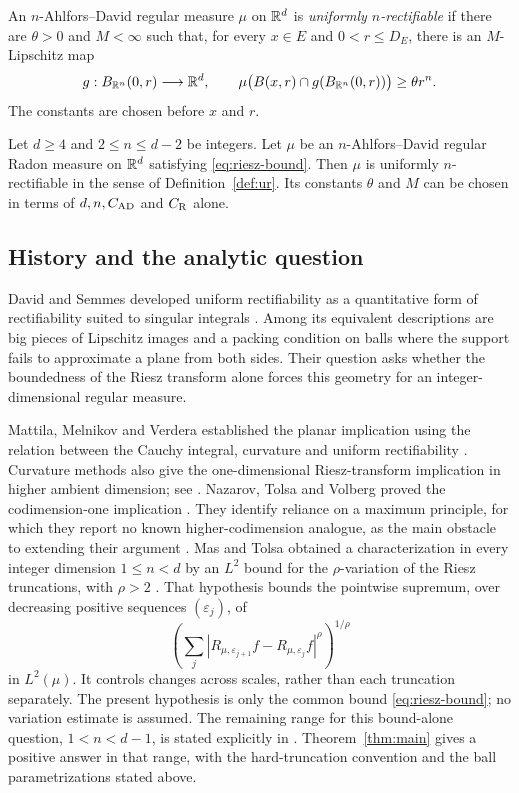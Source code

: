 \begin{definition}\label{def:ur}
An $n$-Ahlfors--David regular measure $\mu$ on $\mathbb R^d$ is
\emph{uniformly $n$-rectifiable} if there are $\theta>0$ and $M<\infty$
such that, for every $x\in E$ and $0<r\le D_E$, there is an
$M$-Lipschitz map
\[
 g:B_{\mathbb R^n}(0,r)\longrightarrow\mathbb R^d,
 \qquad
 \mu\bigl(B(x,r)\cap g(B_{\mathbb R^n}(0,r))\bigr)\ge\theta r^n.
\]
The constants are chosen before $x$ and $r$.
\end{definition}

\begin{theorem}\label{thm:main}
Let $d\ge4$ and $2\le n\le d-2$ be integers. Let $\mu$ be an
$n$-Ahlfors--David regular Radon measure on $\mathbb R^d$ satisfying
\eqref{eq:riesz-bound}. Then $\mu$ is uniformly $n$-rectifiable in the
sense of Definition~\ref{def:ur}. Its constants $\theta$ and $M$ can
be chosen in terms of $d,n,C_{\rm AD}$ and $C_{\rm R}$ alone.
\end{theorem}

\subsection{History and the analytic question}

David and Semmes developed uniform rectifiability as a quantitative
form of rectifiability suited to singular integrals
\cite{DavidSemmes1991,DavidSemmes1993}. Among its equivalent
descriptions are big pieces of Lipschitz images and a packing condition
on balls where the support fails to approximate a plane from both
sides. Their question asks whether the boundedness of the Riesz
transform alone forces this geometry for an integer-dimensional
regular measure.

Mattila, Melnikov and Verdera established the planar implication using
the relation between the Cauchy integral, curvature and uniform
rectifiability \cite{MattilaMelnikovVerdera1996}. Curvature methods
also give the one-dimensional Riesz-transform implication in higher
ambient dimension; see \cite[Theorem~4]{Farag2000}.
Nazarov, Tolsa and Volberg proved the codimension-one implication
\cite{NazarovTolsaVolberg2014}.
They identify reliance on a maximum principle, for which they report
no known higher-codimension analogue, as the main obstacle to extending
their argument \cite[Section~1]{NazarovTolsaVolberg2014}.
Mas and Tolsa obtained a characterization in every integer dimension
$1\le n<d$ by an $L^2$ bound for the $\rho$-variation of the Riesz
truncations, with $\rho>2$ \cite[Theorem~1.3]{MasTolsa2014Variation}.
That hypothesis bounds the pointwise supremum, over decreasing positive
sequences $(\varepsilon_j)$, of
\[
 \left(\sum_j
   |R_{\mu,\varepsilon_{j+1}}f-R_{\mu,\varepsilon_j}f|^\rho
       \right)^{1/\rho}
\]
in $L^2(\mu)$. It controls changes across scales, rather than each
truncation separately. The present hypothesis is only the common bound
\eqref{eq:riesz-bound}; no variation estimate is assumed.
The remaining range for this bound-alone question,
$1<n<d-1$, is stated explicitly in \cite[Question~4.4]{Tolsa2026ICM}.
Theorem~\ref{thm:main} gives a positive answer in that range, with the
hard-truncation convention and the ball parametrizations stated
above.

